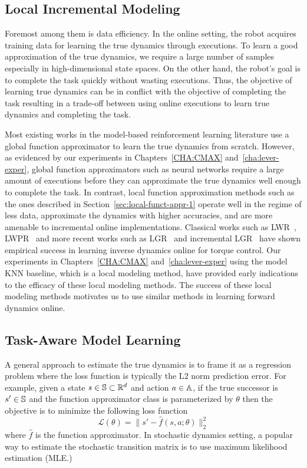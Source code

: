 \subsection{Local Incremental Modeling}
\label{sec:local-modeling}

Foremost among them is data efficiency. In the online setting, the
robot acquires training data for learning the true dynamics through
executions. To learn a good approximation of the true dynamics, we
require a large number of samples especially in high-dimensional state
spaces. On the other hand, the robot's goal is to complete the task
quickly without wasting executions. Thus, the objective of learning
true dynamics can be in conflict with the objective of completing the
task resulting in a trade-off between using online executions to learn
true dynamics and completing the task.

Most existing works in the model-based
reinforcement learning literature use a global function
approximator to learn the true dynamics from scratch. However, as
evidenced by our experiments in Chapters~\ref{CHA:CMAX}
and~\ref{cha:lever-exper}, global function approximators such as
neural networks require a large amount of executions before they can
approximate the true dynamics well enough to complete the task. In
contrast, local function approximation methods such as the ones
described in Section~\ref{sec:local-funct-appr-1} operate well in the
regime of less data, approximate the dynamics with higher accuracies, and are more
amenable to incremental online implementations. Classical works such as
LWR~\cite{DBLP:journals/air/AtkesonMS97},
LWPR~\cite{DBLP:conf/icml/VijayakumarS00} and more recent works such
as LGR~\cite{DBLP:journals/corr/MeierHS14} and incremental
LGR~\cite{DBLP:conf/nips/MeierHS14} have shown empirical success in
learning inverse dynamics online for torque
control. Our experiments in Chapters~\ref{CHA:CMAX} and~\ref{cha:lever-exper}
using the model KNN baseline, which is a local modeling method, have
provided early indications to the efficacy of these local modeling
methods. The success of these local modeling methods motivates us to
use similar methods in learning forward dynamics online. 

\subsection{Task-Aware Model Learning}
\label{sec:task-driven-learning}

A general approach to estimate the true dynamics is to frame it as a
regression problem where the loss function is typically the L$2$ norm
prediction error. For example, given a state $s \in \mathbb{S}
\subset \mathbb{R}^d$
and action $a \in \mathbb{A}$,
if the true successor is $s' \in \mathbb{S}$ and the function
approximator class is parameterized by $\theta$ then the objective is
to minimize the following loss function
\begin{equation}
  \label{eq:16}
  \mathcal{L}(\theta) = \|s' - \hat{f}(s, a; \theta)\|_2^2
\end{equation}
where $\hat{f}$ is the function approximator. In stochastic dynamics
setting, a popular way to estimate the stochastic transition matrix is
to use maximum likelihood estimation (MLE.)

